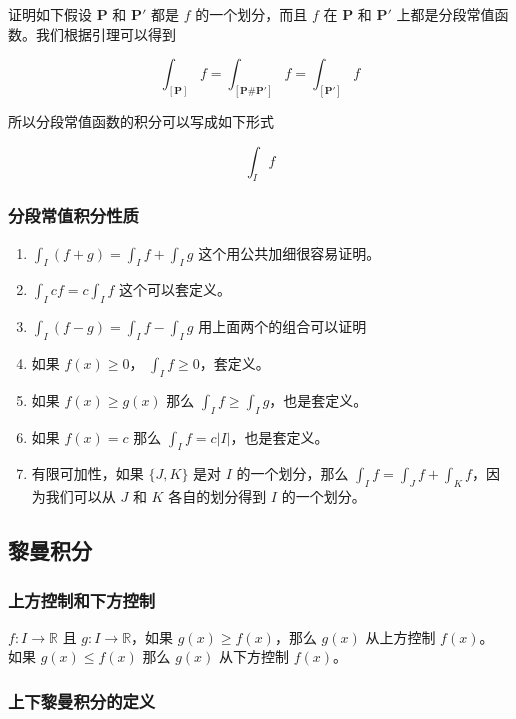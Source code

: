 证明如下假设 $\mathbf{P}$ 和 $\mathbf{P'}$ 都是 $f$ 的一个划分，而且 $f$ 在 $\mathbf{P}$ 和 $\mathbf{P'}$ 上都是分段常值函数。我们根据引理可以得到  

\[
    \int_{[\mathbf{P}]} f =\int_{[\mathbf{P \# P'}]} f = \int_{[\mathbf{P'}]} f
\]

所以分段常值函数的积分可以写成如下形式

\[
\int_{I} f
\]

\subsubsection{分段常值积分性质}

\begin{enumerate}
    \item $\int_{I} (f + g) = \int_{I} f + \int_{I} g$ 这个用公共加细很容易证明。
    \item $\int_{I} cf = c\int_{I} f$ 这个可以套定义。
    \item $\int_{I} (f - g) = \int_{I} f - \int_{I} g$ 用上面两个的组合可以证明
    \item 如果 $f(x) \ge 0$， $\int_{I} f \ge 0$，套定义。
    \item 如果 $f(x) \ge g(x)$ 那么 $\int_{I} f \ge \int_{I}g $，也是套定义。
    \item 如果 $f(x) = c$ 那么 $\int_{I} f  = c \lvert I \rvert $，也是套定义。
    \item 有限可加性，如果 $\{J,K \}$ 是对 $I$ 的一个划分，那么 $\int_{I}f = \int_{J}f + \int_{K} f$，因为我们可以从 $J$ 和 $K$ 各自的划分得到 $I$ 的一个划分。
\end{enumerate}

\subsection{黎曼积分}

\subsubsection{上方控制和下方控制}

$f: I \to \mathbb{R}$ 且 $g: I \to \mathbb{R}$，如果 $g(x) \ge f(x)$，那么 $g(x) $ 从上方控制 $f(x)$。
如果 $g(x) \le f(x)$ 那么 $g(x)$ 从下方控制 $f(x) $。

\subsubsection{上下黎曼积分的定义}

